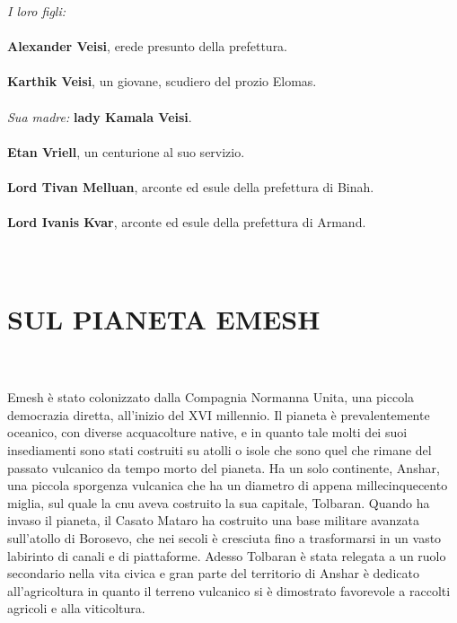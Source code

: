 \textit{I loro figli:}
\leavevmode\\
\leavevmode\\
\phantom{123}\textbf{Alexander Veisi}, erede presunto della prefettura.
\leavevmode\\
\leavevmode\\
\phantom{123}\textbf{Karthik Veisi}, un giovane, scudiero del prozio {Elomas}.
\leavevmode\\
\leavevmode\\
\textit{Sua madre:} \textbf{lady Kamala Veisi}.
\leavevmode\\
\leavevmode\\
\phantom{123}\textbf{Etan Vriell}, un centurione al suo servizio.
\leavevmode\\
\leavevmode\\
\phantom{123}\textbf{Lord Tivan Melluan}, arconte ed esule della prefettura di Binah.
\leavevmode\\
\leavevmode\\
\phantom{123}\textbf{Lord Ivanis Kvar}, arconte ed esule della prefettura di Armand.
\leavevmode\\
\leavevmode\\
\leavevmode\\
\section{SUL PIANETA EMESH}
\leavevmode\\
\leavevmode\\
Emesh è stato colonizzato dalla Compagnia Normanna Unita, una piccola
democrazia diretta, all'inizio del XVI millennio. Il pianeta è
prevalentemente oceanico, con diverse acquacolture native, e in quanto
tale molti dei suoi insediamenti sono stati costruiti su atolli o isole
che sono quel che rimane del passato vulcanico da tempo morto del
pianeta. Ha un solo continente, Anshar, una piccola sporgenza vulcanica
che ha un diametro di appena millecinquecento miglia, sul quale la
\foreignlanguage{italian}{cnu} aveva costruito la sua capitale,
Tolbaran. Quando ha invaso il pianeta, il Casato Mataro ha costruito una
base militare avanzata sull'atollo di Borosevo, che nei secoli è
cresciuta fino a trasformarsi in un vasto labirinto di canali e di
piattaforme. Adesso Tolbaran è stata relegata a un ruolo secondario
nella vita civica e gran parte del territorio di Anshar è dedicato
all'agricoltura in quanto il terreno vulcanico si è dimostrato
favorevole a raccolti agricoli e alla viticoltura.

